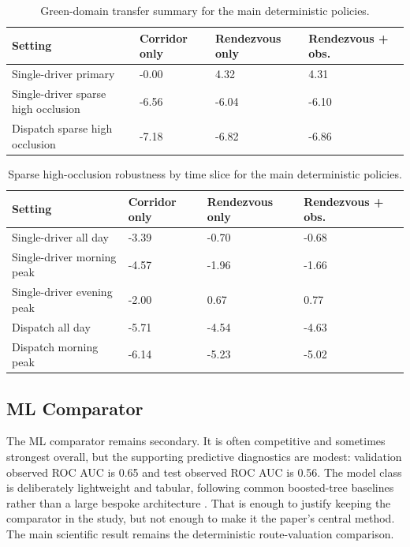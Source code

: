 \documentclass[journal]{IEEEtran}
\begin{document}
\begin{table}[!t]
\caption{Green-domain transfer summary for the main deterministic policies.}
\label{tab:green}
\centering
\footnotesize
\begin{tabularx}{\columnwidth}{|L{0.34\columnwidth}|X|X|X|}
\hline
{}\textbf{Setting} & \textbf{Corridor only} & \textbf{Rendezvous only} & \textbf{Rendezvous + obs.} \\
\hline
Single-driver primary & -0.00 & 4.32 & 4.31 \\
\hline
Single-driver sparse high occlusion & -6.56 & -6.04 & -6.10 \\
\hline
Dispatch sparse high occlusion & -7.18 & -6.82 & -6.86 \\
\hline
\end{tabularx}
\end{table}

\begin{table}[!t]
\caption{Sparse high-occlusion robustness by time slice for the main deterministic policies.}
\label{tab:timeslice}
\centering
\footnotesize
\begin{tabularx}{\columnwidth}{|L{0.34\columnwidth}|X|X|X|}
\hline
{}\textbf{Setting} & \textbf{Corridor only} & \textbf{Rendezvous only} & \textbf{Rendezvous + obs.} \\
\hline
Single-driver all day & -3.39 & -0.70 & -0.68 \\
\hline
Single-driver morning peak & -4.57 & -1.96 & -1.66 \\
\hline
Single-driver evening peak & -2.00 & 0.67 & 0.77 \\
\hline
Dispatch all day & -5.71 & -4.54 & -4.63 \\
\hline
Dispatch morning peak & -6.14 & -5.23 & -5.02 \\
\hline
\end{tabularx}
\end{table}

\subsection{ML Comparator}
The ML comparator remains secondary. It is often competitive and sometimes strongest overall, but the supporting predictive diagnostics are modest: validation observed ROC AUC is 0.65 and test observed ROC AUC is 0.56. The model class is deliberately lightweight and tabular, following common boosted-tree baselines rather than a large bespoke architecture \cite{chen2016xgboost,ke2017}. That is enough to justify keeping the comparator in the study, but not enough to make it the paper's central method. The main scientific result remains the deterministic route-valuation comparison.
\end{document}
